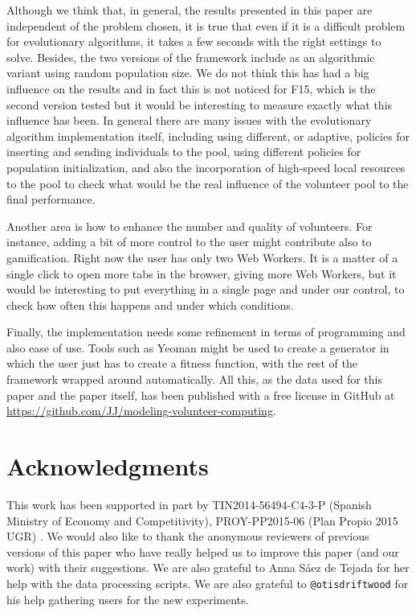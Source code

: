 \documentclass[letterpaper]{article}
\begin{document}
Although we think that, in general, the results presented in this
paper are independent of the problem chosen, it is true that even if
it is a difficult problem for evolutionary algorithms, it takes a few
seconds with the right settings to solve. 
Besides, the two versions of the framework include as an
algorithmic variant using random population size. We do not think this
has had a big influence on the results and in fact this is not noticed
for F15, which is the second version tested but it would be interesting to
measure exactly what this influence has been. In general there are
many issues with the evolutionary algorithm implementation itself,
including using different, or adaptive, policies for inserting and
sending individuals to the pool,
using different policies for population initialization, and also the
incorporation of high-speed local resources to the pool to check what
would be the real influence of the volunteer pool to the final
performance. 

Another area is how to enhance the number and quality of
volunteers. For instance, adding a bit of more
control to the user might contribute also to gamification. Right now
the user has only two Web Workers. It is a matter of a single click to
open more tabs in the browser, giving more Web Workers, but it would be
interesting to put everything in a single page and under our control,
to check how often this happens and under which conditions. 

Finally, the implementation needs some refinement in terms of
programming and also ease of use. Tools such as Yeoman might be used %
to create a generator in which the user just has to create a fitness
function, with the rest of the framework wrapped around
automatically. All this, as the data used for this paper and the paper
itself, has been published with a free license in GitHub at
\url{https://github.com/JJ/modeling-volunteer-computing}.  

\section*{Acknowledgments}

This work has been supported in part by TIN2014-56494-C4-3-P (Spanish Ministry of Economy and Competitivity),
PROY-PP2015-06 (Plan Propio 2015 UGR)  %
. We would also like to thank the
anonymous reviewers of previous versions of this paper who have really
helped us to improve 
this paper (and our work) with their suggestions. We are also grateful
to Anna S\'aez de Tejada for her help with the data processing
scripts. We are also grateful to {\tt @otisdriftwood} for his help
gathering users for the new experiments. 




\end{document}

